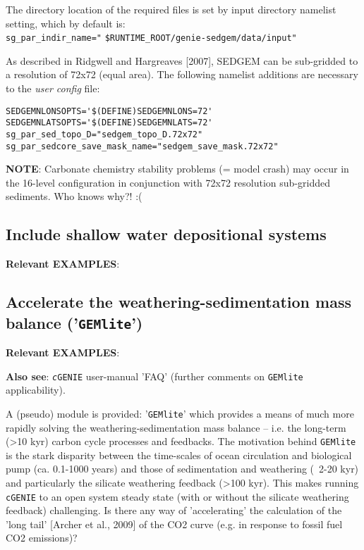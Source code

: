 \documentclass[10pt,twoside]{article}
\begin{document}
The directory location of the required files is set by input directory namelist setting, which by default is:
\\\texttt{sg\_par\_indir\_name="} \texttt{\$RUNTIME\_ROOT/genie-sedgem/data/input"}

As described in Ridgwell and Hargreaves [2007], SEDGEM can be sub-gridded to a resolution of 72x72 (equal area). The following namelist additions are necessary to the \textit{user config} file:
\vspace{-5.5pt}\begin{verbatim}
SEDGEMNLONSOPTS='$(DEFINE)SEDGEMNLONS=72'
SEDGEMNLATSOPTS='$(DEFINE)SEDGEMNLATS=72'
sg_par_sed_topo_D="sedgem_topo_D.72x72"
sg_par_sedcore_save_mask_name="sedgem_save_mask.72x72"
\end{verbatim}\vspace{-5.5pt}

\textbf{NOTE}: Carbonate chemistry stability problems (= model crash) may occur in the 16-level configuration in conjunction with 72x72 resolution sub-gridded sediments. Who knows why?! :(



\subsection{Include shallow water depositional systems}\label{Include shallow water depositional systems}

\noindent \textbf{Relevant EXAMPLES}: 




\subsection{Accelerate the weathering-sedimentation mass balance ('\texttt{GEMlite}')}\label{GEMlite}

\noindent \textbf{Relevant EXAMPLES}: 

\noindent \textbf{Also see}: \texttt{\textit{c}GENIE} user-manual 'FAQ' (further comments on \texttt{GEMlite} applicability).

\noindent A (pseudo) module is provided: '\texttt{GEMlite}' which provides a means of much more rapidly solving the weathering-sedimentation mass balance -- i.e. the long-term (>10 kyr) carbon cycle processes and feedbacks. The motivation behind \texttt{GEMlite} is the stark disparity between the time-scales of ocean circulation and biological pump (ca. 0.1-1000 years) and those of sedimentation and weathering (~2-20 kyr) and particularly the silicate weathering feedback (>100 kyr). This makes running \texttt{cGENIE} to an open system steady state (with or without the silicate weathering feedback) challenging. Is there any way of 'accelerating' the calculation of the 'long tail' [Archer et al., 2009] of the CO2 curve (e.g. in response to fossil fuel CO2 emissions)?
\end{document}
